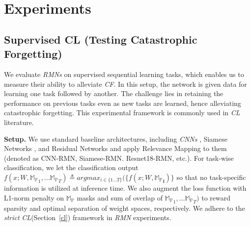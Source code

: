 \documentclass{article}
\begin{document}
\iffalse
\begin{algorithm}[tb]
	\caption{RMN Unsupervised Continual Learning for CR Testing}
	\label{algo2}
\begin{algorithmic}[1]
    \STATE {\bfseries Input:} data $x$, ground truth $y$
    \STATE {\bfseries Given:} parameters $\mathbf{W}$, $\mathbb{M_P}_{est\_j}$ with $est\_j=0$, Task Switch Detection Method \textit{TSD}
	\FOR{each task $j$}
	\STATE $f(x; \mathbf{W}, \mathbf{\mathbb{M_P}_{est\_j}}) \Rightarrow \hat{y}$
	\STATE Compute Loss : $\textbb{L(\hat{y},y)}$ 
	\IF{$TSD(x)$ is True}
	\STATE $est\_j++$
	\STATE Add $\mathbb{M_P}_{est\_j}$ to learn-able parameter list
	\STATE $f(x; \mathbf{W}, \mathbf{\mathbb{M_P}_{est\_j}}) \Rightarrow \hat{y}$
	\STATE Re-Compute Loss : $\textbb{L(\hat{y},y)}$
	\ENDIF
	\STATE Backpropagate and optimize
	\STATE Sample $x_g$ from standard Gaussian distribution with same shape as $x$
\STATE $f(x_g; \mathbf{W}, \mathbf{\mathbb{M_P}_{est\_j}}) \Rightarrow \hat{y}$
	\STATE Compute Loss : $||\hat{y}-0||_2^2$ 
	\STATE Backpropagate and optimize
	\STATE Stabilize (fix) parameters in $f$ where $\textbb{\mathbb{M_P}} \approx 1$
	\ENDFOR
	\STATE {\bfseries Inference:} For data $x$:
	\STATE {\bfseries Output:} $max_k f(x,k;W)$
\end{algorithmic}
\end{algorithm}
\fi
\section{Experiments}\label{ex}


\subsection{Supervised CL (Testing Catastrophic Forgetting)}\label{cf-ex}

We evaluate \textit{RMNs} on supervised sequential learning tasks, which enables us to measure their ability to alleviate \textit{CF}. In this setup, the network is given data for learning one task followed by another. The challenge lies in retaining the performance on previous tasks even as new tasks are learned, hence alleviating catastrophic forgetting. This experimental framework is commonly used in \textit{CL} literature.  

\textbf{Setup.}  
We use standard baseline architectures, including \textit{CNNs} \cite{lecun1995convolutional}, Siamese Networks \cite{koch2015siamese}, and Residual Networks\cite{he2015deep} and apply Relevance Mapping to them (denoted as CNN-RMN, Siamese-RMN. Resnet18-RMN, etc.). For task-wise classification, we let the classification output $f(x; W, \mathbf{\mathbb{M_P}}_1, \dots \mathbf{\mathbb{M_P}}_T) \triangleq argmax_{i \in \{ 1\dots T \}}(\{f(x; W, \mathbf{\mathbb{M_P}_i})\}$ so that no task-specific information is utilized at inference time. We also augment the loss function with L1-norm penalty on $\mathbf{\mathbb{M_P}}$ masks and sum of overlap of $\mathbf{\mathbb{M_P}}_1, \dots \mathbf{\mathbb{M_P}}_T)$ to reward sparsity and optimal separation of weight spaces, respectively. We adhere to the \textit{strict} \textit{CL}(Section~\ref{cl}) framework in \textit{RMN} experiments. 
\end{document}
